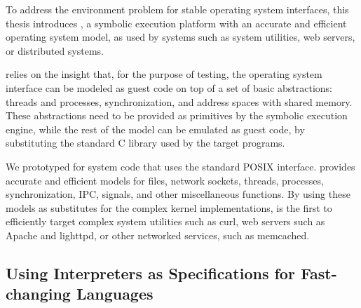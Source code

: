 
To address the environment problem for stable operating system interfaces, this thesis introduces \cnine, a symbolic execution platform with an accurate and efficient operating system model, as used by systems such as system utilities, web servers, or distributed systems.



\cnine relies on the insight that, for the purpose of testing, the operating system interface can be modeled as guest code on top of a set of basic abstractions: threads and processes, synchronization, and address spaces with shared memory.
%
These abstractions need to be provided as primitives by the symbolic execution engine, while the rest of the model can be emulated as guest code, by substituting the standard C library used by the target programs.



We prototyped \cnine for system code that uses the standard POSIX interface.  \cnine provides accurate and efficient models for files, network sockets, threads, processes, synchronization, IPC, signals, and other miscellaneous functions.
%
By using these models as substitutes for the complex kernel implementations, \cnine is the first to efficiently target complex system utilities such as \textsf{curl}, web servers such as Apache and lighttpd, or other networked services, such as memcached.


\subsection{Using Interpreters as Specifications for Fast-changing Languages}

